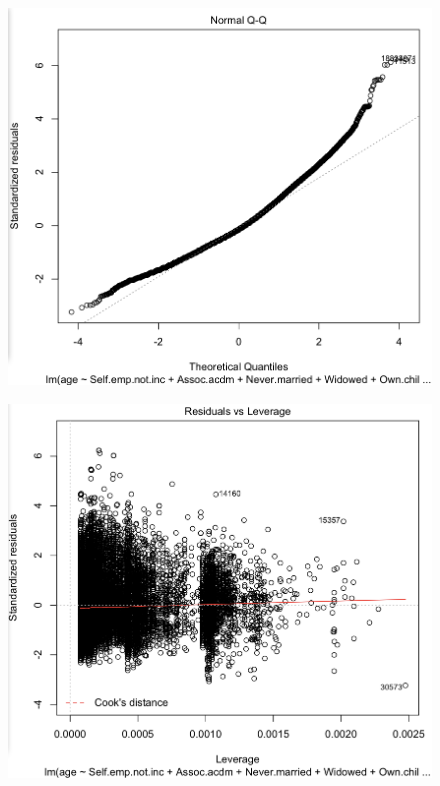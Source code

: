 \documentclass[letter]{article}
\begin{document}
 \begin{figure}
 \includegraphics[scale=0.5]{figures/ageNormResidCensus.png}
 \caption{}
  \label{fig:ageNormResidCensus}
\end{figure}

\begin{figure}
 \includegraphics[scale=0.5]{figures/cookResidCensus.png}
 \caption{}
  \label{fig:cookResidCensus}
\end{figure}
\end{document}
